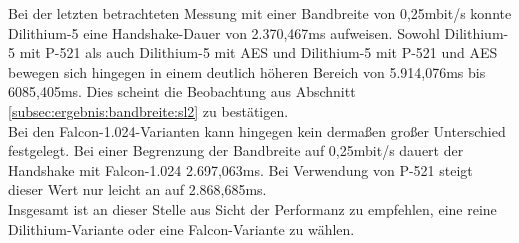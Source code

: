 		Bei der letzten betrachteten Messung mit einer Bandbreite von 0,25mbit/s konnte Dilithium-5 eine Handshake-Dauer von 2.370,467ms aufweisen. Sowohl Dilithium-5 mit P-521 als auch Dilithium-5 mit AES und Dilithium-5 mit P-521 und AES bewegen sich hingegen in einem deutlich höheren Bereich von 5.914,076ms bis 6085,405ms. Dies scheint die Beobachtung aus Abschnitt \ref{subsec:ergebnis:bandbreite:sl2} zu bestätigen.\\
		
		Bei den Falcon-1.024-Varianten kann hingegen kein dermaßen großer Unterschied festgelegt. Bei einer Begrenzung der Bandbreite auf 0,25mbit/s dauert der Handshake mit Falcon-1.024 2.697,063ms. Bei Verwendung von P-521 steigt dieser Wert nur leicht an auf 2.868,685ms.\\
		
		Insgesamt ist an dieser Stelle aus Sicht der Performanz zu empfehlen, eine reine Dilithium-Variante oder eine Falcon-Variante zu wählen.
